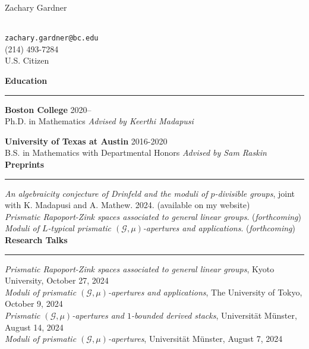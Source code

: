\documentclass[11pt]{article}
\newenvironment{mysection}{
\color{mygreen}\bfseries\large
}
{
\\ \rule{\textwidth}{1pt}\hspace{-.25em}
} %
\begin{document}
\begin{center}
\begin{LARGE}Zachary Gardner\end{LARGE} \\
\vspace{1em}
\texttt{zachary.gardner@bc.edu} \\
(214) 493-7284 \\
U.S. Citizen \\
\end{center}

\begin{mysection}Education\end{mysection}
\textbf{Boston College} \hfill 2020-- \\
Ph.D. in Mathematics \hfill \textit{Advised by Keerthi Madapusi}

\textbf{University of Texas at Austin} \hfill 2016-2020 \\
B.S. in Mathematics with Departmental Honors \hfill \textit{Advised by Sam Raskin} \\

\begin{mysection}Preprints\end{mysection}
\!\!\textit{An algebraicity conjecture of Drinfeld and the moduli of $p$-divisible groups}, joint with K. Madapusi and A. Mathew. 2024. (available on my website) \\
\textit{Prismatic Rapoport-Zink spaces associated to general linear groups}. (\textit{forthcoming}) \\
\textit{Moduli of $L$-typical prismatic $(\mathcal{G},\mu)$-apertures and applications}. (\textit{forthcoming}) \\

\begin{mysection}Research Talks\end{mysection}
\textit{Prismatic Rapoport-Zink spaces associated to general linear groups}, Kyoto University, October 27, 2024 \\
\textit{Moduli of prismatic $(\mathcal{G},\mu)$-apertures and applications}, The University of Tokyo, October 9, 2024 \\
\textit{Prismatic $(\mathcal{G},\mu)$-apertures and $1$-bounded derived stacks}, Universit\"{a}t M\"{u}nster, August 14, 2024 \\
\textit{Moduli of prismatic $(\mathcal{G},\mu)$-apertures}, Universit\"{a}t M\"{u}nster, August 7, 2024 \\
\end{document}
